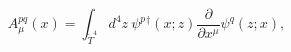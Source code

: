 \begin{equation}\label{t4inverse}
A_\mu^{pq}(x)=\int_{\tilde T^4} d^4 z
~\psi^p{}^\dagger(x;z)
\frac{\partial}{\partial x^\mu}
\psi^q(z;x),\end{equation}

